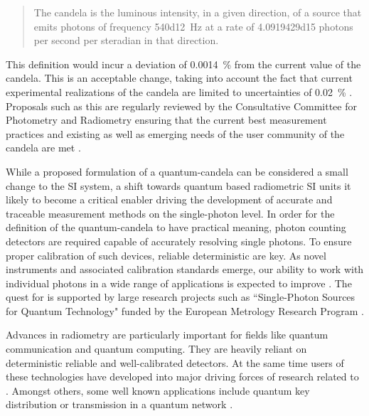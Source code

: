 	\begin{quote}
		The candela is the luminous intensity, in a given direction, of a source that emits photons of frequency \SI{540d12}{\hertz} at a rate of \num{4.0919429d15} photons per second per steradian in that direction.
	\end{quote}

	This definition would incur a deviation of \SI{0.0014}{\percent} from the current value of the candela. This is an acceptable change, taking into account the fact that current experimental realizations of the candela are limited to uncertainties of \SI{0.02}{\percent} \cite{Cheung2007}. Proposals such as this are regularly reviewed by the Consultative Committee for Photometry and Radiometry ensuring that the current best measurement practices and existing as well as emerging needs of the user community of the candela are met \cite{zwinkels2010photometry}.

	While a proposed formulation of a quantum-candela can be considered a small change to the SI system, a shift towards quantum based radiometric SI units it likely to become a critical enabler driving the development of accurate and traceable measurement methods on the single-photon level. In order for the definition of the quantum-candela to have practical meaning, photon counting detectors are required capable of accurately resolving single photons. To ensure proper calibration of such devices, reliable deterministic \spss are key. As novel instruments and associated calibration standards emerge, our ability to work with individual photons in a wide range of applications is expected to improve \cite{buller2009single, eisaman2011invited, sangouard2012single, chunnilall2014metrology}. The quest for \spss is supported by large research projects such as ``Single-Photon Sources for Quantum Technology" funded by the European Metrology Research Program \cite{SiquteProject,QuCandelaProject}.

	Advances in radiometry are particularly important for fields like quantum communication and quantum computing. They are heavily reliant on deterministic reliable \spss and well-calibrated detectors. At the same time users of these technologies have developed into major driving forces of research related to \spss \cite{scheel2009single, chunnilall2014metrology}. Amongst others, some well known applications include quantum key distribution \cite{bennett2014quantum, beveratos2002single, alleaume2004experimental} or transmission in a quantum network \cite{childress2006fault, bernien2012two, pfaff2014unconditional}.

